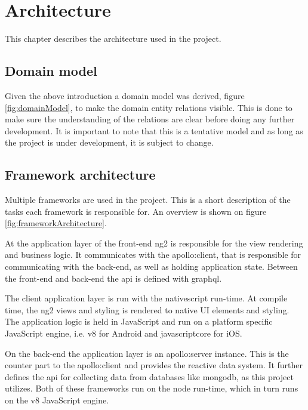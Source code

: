 \chapter{Architecture}
This chapter describes the architecture used in the project.

\section{Domain model}
Given the above introduction a domain model was derived, figure \ref{fig:domainModel}, to make the domain entity relations visible.
This is done to make sure the understanding of the relations are clear before doing any further development.
It is important to note that this is a tentative model and as long as the project is under development, it is subject to change.


\section{Framework architecture}
Multiple frameworks are used in the project.
This is a short description of the tasks each framework is responsible for.
An overview is shown on figure \ref{fig:frameworkArchitecture}.

At the application layer of the front-end \gls{ng2} is responsible for the view rendering and business logic.
It communicates with the \gls{apollo:client}, that is responsible for communicating with the back-end, as well as holding application state.
Between the front-end and back-end the \gls{api} is defined with \gls{graphql}.

The client application layer is run with the \gls{nativescript} run-time.
At compile time, the \gls{ng2} views and styling is rendered to native UI elements and styling.
The application logic is held in JavaScript and run on a platform specific JavaScript engine, i.e. \gls{v8} for Android and \gls{javascriptcore} for iOS.

On the back-end the application layer is an \gls{apollo:server} instance.
This is the counter part to the \gls{apollo:client} and provides the reactive data system.
It further defines the \gls{api} for collecting data from databases like \gls{mongodb}, as this project utilizes.
Both of these frameworks run on the \gls{node} run-time, which in turn runs on the \gls{v8} JavaScript engine.


